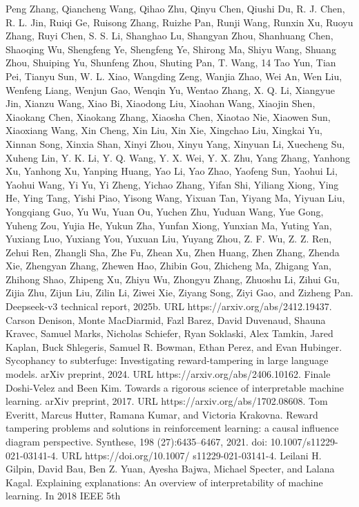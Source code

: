 Peng Zhang, Qiancheng Wang, Qihao Zhu, Qinyu Chen, Qiushi Du, R. J. Chen, R. L. Jin, Ruiqi
Ge, Ruisong Zhang, Ruizhe Pan, Runji Wang, Runxin Xu, Ruoyu Zhang, Ruyi Chen, S. S. Li,
Shanghao Lu, Shangyan Zhou, Shanhuang Chen, Shaoqing Wu, Shengfeng Ye, Shengfeng Ye,
Shirong Ma, Shiyu Wang, Shuang Zhou, Shuiping Yu, Shunfeng Zhou, Shuting Pan, T. Wang,
14
Tao Yun, Tian Pei, Tianyu Sun, W. L. Xiao, Wangding Zeng, Wanjia Zhao, Wei An, Wen Liu,
Wenfeng Liang, Wenjun Gao, Wenqin Yu, Wentao Zhang, X. Q. Li, Xiangyue Jin, Xianzu Wang,
Xiao Bi, Xiaodong Liu, Xiaohan Wang, Xiaojin Shen, Xiaokang Chen, Xiaokang Zhang, Xiaosha
Chen, Xiaotao Nie, Xiaowen Sun, Xiaoxiang Wang, Xin Cheng, Xin Liu, Xin Xie, Xingchao Liu,
Xingkai Yu, Xinnan Song, Xinxia Shan, Xinyi Zhou, Xinyu Yang, Xinyuan Li, Xuecheng Su,
Xuheng Lin, Y. K. Li, Y. Q. Wang, Y. X. Wei, Y. X. Zhu, Yang Zhang, Yanhong Xu, Yanhong
Xu, Yanping Huang, Yao Li, Yao Zhao, Yaofeng Sun, Yaohui Li, Yaohui Wang, Yi Yu, Yi Zheng,
Yichao Zhang, Yifan Shi, Yiliang Xiong, Ying He, Ying Tang, Yishi Piao, Yisong Wang, Yixuan
Tan, Yiyang Ma, Yiyuan Liu, Yongqiang Guo, Yu Wu, Yuan Ou, Yuchen Zhu, Yuduan Wang, Yue
Gong, Yuheng Zou, Yujia He, Yukun Zha, Yunfan Xiong, Yunxian Ma, Yuting Yan, Yuxiang Luo,
Yuxiang You, Yuxuan Liu, Yuyang Zhou, Z. F. Wu, Z. Z. Ren, Zehui Ren, Zhangli Sha, Zhe Fu,
Zhean Xu, Zhen Huang, Zhen Zhang, Zhenda Xie, Zhengyan Zhang, Zhewen Hao, Zhibin Gou,
Zhicheng Ma, Zhigang Yan, Zhihong Shao, Zhipeng Xu, Zhiyu Wu, Zhongyu Zhang, Zhuoshu
Li, Zihui Gu, Zijia Zhu, Zijun Liu, Zilin Li, Ziwei Xie, Ziyang Song, Ziyi Gao, and Zizheng Pan.
Deepseek-v3 technical report, 2025b. URL https://arxiv.org/abs/2412.19437.
Carson Denison, Monte MacDiarmid, Fazl Barez, David Duvenaud, Shauna Kravec, Samuel Marks,
Nicholas Schiefer, Ryan Soklaski, Alex Tamkin, Jared Kaplan, Buck Shlegeris, Samuel R. Bowman,
Ethan Perez, and Evan Hubinger. Sycophancy to subterfuge: Investigating reward-tampering in
large language models. arXiv preprint, 2024. URL https://arxiv.org/abs/2406.10162.
Finale Doshi-Velez and Been Kim. Towards a rigorous science of interpretable machine learning.
arXiv preprint, 2017. URL https://arxiv.org/abs/1702.08608.
Tom Everitt, Marcus Hutter, Ramana Kumar, and Victoria Krakovna. Reward tampering problems
and solutions in reinforcement learning: a causal influence diagram perspective. Synthese, 198
(27):6435–6467, 2021. doi: 10.1007/s11229-021-03141-4. URL https://doi.org/10.1007/
s11229-021-03141-4.
Leilani H. Gilpin, David Bau, Ben Z. Yuan, Ayesha Bajwa, Michael Specter, and Lalana Kagal.
Explaining explanations: An overview of interpretability of machine learning. In 2018 IEEE 5th
